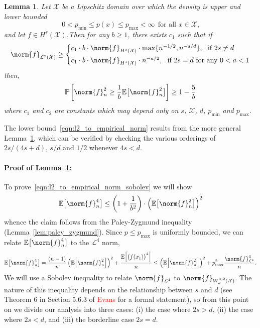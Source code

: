 \documentclass{article}
\newcommand{\1}{\mathbf{1}}
\newcommand{\Xset}{\mathcal{X}}
\newcommand{\Leb}{\mathcal{L}}
\newcommand{\Ebb}{\mathbb{E}}
\theoremstyle{alden}
\theoremstyle{aldenthm}
\newtheorem{lemma}{Lemma}
\theoremstyle{definition}
\theoremstyle{remark}
\begin{document}
\begin{lemma}
	\label{lem:empirical_norm_sobolev}
	Let $\Xset$ be a Lipschitz domain over which the density is upper and lower bounded 
	\begin{equation*}
	0 < p_{\min} \leq p(x) \leq p_{\max} < \infty ~~\textrm{for all $x \in \Xset$,}
	\end{equation*}
	and let $f \in H^s(\Xset)$.Then for any $b \geq 1$, there exists $c_1$ such that if 
	\begin{equation}
	\norm{f}_{\Leb^2(\Xset)} \geq 
	\begin{cases*}
	c_1 \cdot b \cdot \norm{f}_{H^s(\Xset)} \cdot \max\{n^{-1/2},n^{-s/d}\},~~\textrm{if}~2s \neq d \\
	c_1 \cdot b \cdot \norm{f}_{H^s(\Xset)} \cdot n^{-a/2},~~\textrm{if}~ 2s = d ~\textrm{for any}~ 0 < a < 1
	\end{cases*}
	\end{equation}
	then,
	\begin{equation}
	\label{eqn:l2_to_empirical_norm_sobolev}
	\mathbb{P}\left[\norm{f}_n^2 \geq \frac{1}{b} \Ebb\bigl[\norm{f}_n^2\bigr]\right] \geq 1 - \frac{5}{b}
	\end{equation}
	where $c_1$ and $c_2$ are constants which may depend only on $s$, $\Xset$, $d$, $p_{\min}$ and $p_{\max}$.
\end{lemma}
The lower bound~\eqref{eqn:l2_to_empirical_norm} results from the more general Lemma~\ref{lem:empirical_norm_sobolev}, which can be verified by checking the various orderings of $2s/(4s + d)$, $s/d$ and $1/2$ whenever $4s < d$. 

\paragraph{Proof of Lemma~\ref{lem:empirical_norm_sobolev}:}

To prove~\eqref{eqn:l2_to_empirical_norm_sobolev} we will show
\begin{equation*}
\mathbb{E}\bigl[\norm{f}_n^4\bigr] \leq \left(1 + \frac{1}{b^2}\right)\cdot \left(\mathbb{E}\bigl[\norm{f}_n^2\bigr]\right)^2
\end{equation*}
whence the claim follows from the Paley-Zygmund inequality (Lemma~\ref{lem:paley_zygmund}). Since $p \leq p_{\max}$ is uniformly bounded, we can relate $\mathbb{E}\bigl[\norm{f}_n^4\bigr]$ to the $\Leb^4$ norm,
\begin{equation*}
\mathbb{E}\bigl[\norm{f}_n^4\bigr] = \frac{(n-1)}{n}\left(\mathbb{E}\Bigl[\norm{f}_n^2\Bigr]\right)^2 + \frac{\mathbb{E}\Bigl[\bigl(f(x_1)\bigr)^4\Bigr]}{n} \leq \left(\mathbb{E}\Bigl[\norm{f}_n^2\Bigr]\right)^2 + p_{\max}^2\frac{\norm{f}_{\Leb^4}^4}{n}.
\end{equation*}
We will use a Sobolev inequality to relate $\norm{f}_{\Leb^4}$ to $\norm{f}_{W_d^{s,2}(\Xset)}$. The nature of this inequality depends on the relationship between $s$ and $d$ (see Theorem 6 in Section 5.6.3 of \textcolor{red}{Evans} for a formal statement), so from this point on we divide our analysis into three cases: (i) the case where $2s > d$, (ii) the case where $2s < d$, and (iii) the borderline case $2s = d$.
\end{document}
